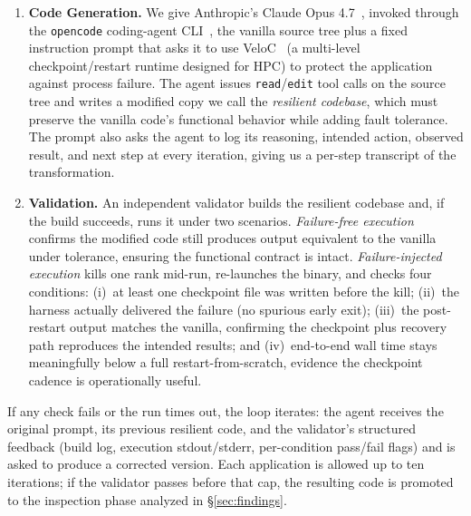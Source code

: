 \documentclass[conference]{IEEEtran}
\begin{document}
\begin{enumerate}[topsep=0pt,itemsep=0pt,leftmargin=*]
    \item \textbf{Code Generation.} We give Anthropic's Claude Opus 4.7~\cite{claude}, invoked through the \texttt{opencode} coding-agent CLI~\cite{opencode}, the vanilla source tree plus a fixed instruction prompt that asks it to use VeloC~\cite{veloc} (a multi-level checkpoint/restart runtime designed for HPC) to protect the application against process failure. The agent issues \texttt{read}/\texttt{edit} tool calls on the source tree and writes a modified copy we call the \emph{resilient codebase}, which must preserve the vanilla code's functional behavior while adding fault tolerance. The prompt also asks the agent to log its reasoning, intended action, observed result, and next step at every iteration, giving us a per-step transcript of the transformation.

    \item \textbf{Validation.} An independent validator builds the resilient codebase and, if the build succeeds, runs it under two scenarios. \emph{Failure-free execution} confirms the modified code still produces output equivalent to the vanilla under tolerance, ensuring the functional contract is intact. \emph{Failure-injected execution} kills one rank mid-run, re-launches the binary, and checks four conditions: (i)~at least one checkpoint file was written before the kill; (ii)~the harness actually delivered the failure (no spurious early exit); (iii)~the post-restart output matches the vanilla, confirming the checkpoint plus recovery path reproduces the intended results; and (iv)~end-to-end wall time stays meaningfully below a full restart-from-scratch, evidence the checkpoint cadence is operationally useful.
\end{enumerate}

\noindent
If any check fails or the run times out, the loop iterates: the agent receives the original prompt, its previous resilient code, and the validator's structured feedback (build log, execution stdout/stderr, per-condition pass/fail flags) and is asked to produce a corrected version. Each application is allowed up to ten iterations; if the validator passes before that cap, the resulting code is promoted to the inspection phase analyzed in \S\ref{sec:findings}.

\end{document}
